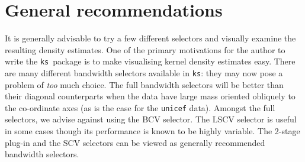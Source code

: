 \documentclass[a4paper,11pt]{article}
\def\ks{\texttt{ks}}
\begin{document}
\section{General recommendations}

It is generally advisable to try a few 
different selectors and visually examine the resulting density estimates. 
One of the primary motivations for the author to write the \ks \ package 
is to make visualising kernel density estimates easy.
There are many different bandwidth selectors available in \ks: they may
now pose a problem of \emph{too} much choice.
The full bandwidth selectors will be better than their diagonal counterparts
when the data have large mass oriented obliquely to the co-ordinate axes 
(as is the case for the \texttt{unicef} data). 
Amongst the full selectors, we advise against using the BCV selector. 
The LSCV selector is useful in some cases though its performance is 
known to be highly variable. The 2-stage plug-in and the SCV selectors
can be viewed as generally recommended bandwidth selectors.



%
\end{document}
